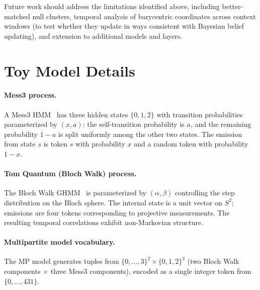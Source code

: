 \documentclass{article}
\begin{document}
Future work should address the limitations identified above, including better-matched
null clusters, temporal analysis of barycentric coordinates across context windows
(to test whether they update in ways consistent with Bayesian belief updating), and
extension to additional models and layers.





\appendix

\section{Toy Model Details}
\label{app:toy}

\paragraph{Mess3 process.}  A Mess3 HMM~\citep{marzen2017predictive} has three
hidden states $\{0, 1, 2\}$ with transition probabilities parameterized by
$(x, a)$: the self-transition probability is $a$, and the remaining probability
$1-a$ is split uniformly among the other two states.  The emission from state $s$
is token $s$ with probability $x$ and a random token with probability $1-x$.

\paragraph{Tom Quantum (Bloch Walk) process.}  The Bloch Walk GHMM~\citep{riechers2025quantum}
is parameterized by $(\alpha, \beta)$ controlling the step distribution on the Bloch
sphere.  The internal state is a unit vector on $S^2$; emissions are four tokens
corresponding to projective measurements.  The resulting temporal correlations
exhibit non-Markovian structure.

\paragraph{Multipartite model vocabulary.}  The MP model generates tuples from
$\{0,\ldots,3\}^2 \times \{0,1,2\}^3$ (two Bloch Walk components $\times$ three
Mess3 components), encoded as a single integer token from $\{0,\ldots,431\}$.
\end{document}

